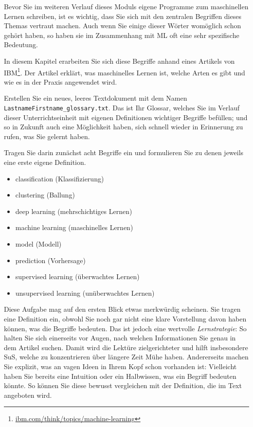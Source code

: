 \label{sec:begriffe}
\begin{lpu}

Bevor Sie im weiteren Verlauf dieses Moduls eigene Programme zum maschinellen Lernen schreiben, ist es wichtig, dass Sie sich mit den zentralen Begriffen dieses Themas vertraut machen. Auch wenn Sie einige dieser Wörter womöglich schon gehört haben, so haben sie im Zusammenhang mit ML oft eine sehr spezifische Bedeutung.

In diesem Kapitel erarbeiten Sie sich diese Begriffe anhand eines Artikels von IBM\footnote{\href{https://www.ibm.com/think/topics/machine-learning}{\url{ibm.com/think/topics/machine-learning}}}. Der Artikel erklärt, was maschinelles Lernen ist, welche Arten es gibt und wie es in der Praxis angewendet wird.

\begin{aufgabe}{1}
Erstellen Sie ein neues, leeres Textdokument mit dem Namen \texttt{LastnameFirstname\_glossary.txt}. Das ist Ihr Glossar, welches Sie im Verlauf dieser Unterrichtseinheit mit eigenen Definitionen wichtiger Begriffe befüllen; und so in Zukunft auch eine Möglichkeit haben, sich schnell wieder in Erinnerung zu rufen, was Sie gelernt haben.

Tragen Sie darin zunächst acht Begriffe ein und formulieren Sie zu denen jeweils eine erste eigene Definition.

\newpage

\begin{itemize}[noitemsep]
  \item classification (Klassifizierung)
  \item clustering (Ballung)
  \item deep learning (mehrschichtiges Lernen)
  \item machine learning (maschinelles Lernen)
  \item model (Modell)
  \item prediction (Vorhersage)
  \item supervised learning (überwachtes Lernen)
  \item unsupervised learning (unüberwachtes Lernen)
\end{itemize}

\end{aufgabe}

Diese Aufgabe mag auf den ersten Blick etwas merkwürdig scheinen. Sie tragen eine Definition ein, obwohl Sie noch gar nicht eine klare Vorstellung davon haben können, was die Begriffe bedeuten. Das ist jedoch eine wertvolle \textit{Lernstrategie}: So halten Sie sich einerseits vor Augen, nach welchen Informationen Sie genau in dem Artikel suchen. Damit wird die Lektüre zielgerichteter und hilft insbesondere SuS, welche zu konzentrieren über längere Zeit Mühe haben. Andererseits machen Sie explizit, was an vagen Ideen in Ihrem Kopf schon vorhanden ist: Vielleicht haben Sie bereits eine Intuition oder ein Halbwissen, was ein Begriff bedeuten könnte. So können Sie diese bewusst vergleichen mit der Definition, die im Text angeboten wird.


\end{lpu}
